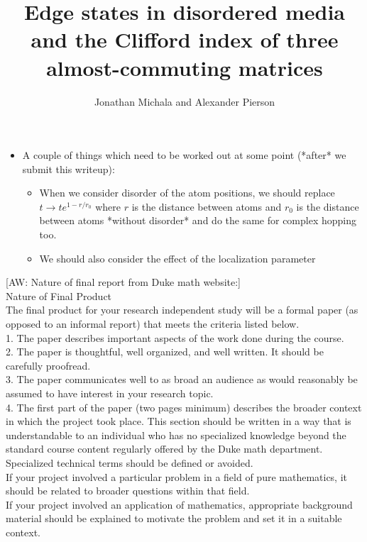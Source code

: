 \documentclass[a4paper]{article}
\title{Edge states in disordered media and the Clifford index of three almost-commuting matrices}
\author{Jonathan Michala and Alexander Pierson}
\newcommand{\aw}[1]{{\color{blue} [AW: #1]}}
\begin{document}
\begin{itemize}
\item A couple of things which need to be worked out at some point (*after* we submit this writeup):
\begin{itemize}
\item When we consider disorder of the atom positions, we should replace $t \rightarrow t e^{1 - r/r_0}$ where $r$ is the distance between atoms and $r_0$ is the distance between atoms *without disorder* and do the same for complex hopping too.
\item We should also consider the effect of the localization parameter
\end{itemize}
\end{itemize}
\aw{Nature of final report from Duke math website:} \\

Nature of Final Product \\

The final product for your research independent study will be a formal paper (as opposed to an informal report) that meets the criteria listed below. \\

1. The paper describes important aspects of the work done during the course. \\

2. The paper is thoughtful, well organized, and well written. It should be carefully proofread. \\

3. The paper communicates well to as broad an audience as would reasonably be assumed to have interest in your research topic. \\

4. The first part of the paper (two pages minimum) describes the broader context in which the project took place. This section should be written in a way that is understandable to an individual who has no specialized knowledge beyond the standard course content regularly offered by the Duke math department. \\

Specialized technical terms should be defined or avoided. \\

If your project involved a particular problem in a field of pure mathematics, it should be related to broader questions within that field. \\

If your project involved an application of mathematics, appropriate background material should be explained to motivate the problem and set it in a suitable context. \\
\end{document}
